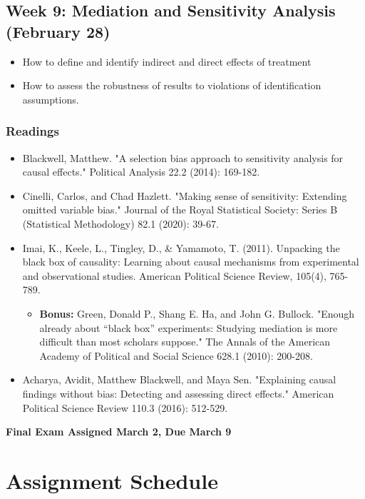 \documentclass[11pt, article, oneside]{memoir}
\theoremstyle{Assumption}
\begin{document}
\subsection{Week 9: Mediation and Sensitivity Analysis (February 28)}

\begin{itemize}
\item How to define and identify indirect and direct effects of treatment
\item How to assess the robustness of results to violations of identification assumptions. 
\end{itemize}

\subsubsection*{Readings}

\begin{itemize}
\item Blackwell, Matthew. "A selection bias approach to sensitivity analysis for causal effects." Political Analysis 22.2 (2014): 169-182.
\item Cinelli, Carlos, and Chad Hazlett. "Making sense of sensitivity: Extending omitted variable bias." Journal of the Royal Statistical Society: Series B (Statistical Methodology) 82.1 (2020): 39-67.
\item Imai, K., Keele, L., Tingley, D., \& Yamamoto, T. (2011). Unpacking the black box of causality: Learning about causal mechanisms from experimental and observational studies. American Political Science Review, 105(4), 765-789.
\begin{itemize}
\item \textbf{Bonus:} Green, Donald P., Shang E. Ha, and John G. Bullock. "Enough already about “black box” experiments: Studying mediation is more difficult than most scholars suppose." The Annals of the American Academy of Political and Social Science 628.1 (2010): 200-208.
\end{itemize}
\item Acharya, Avidit, Matthew Blackwell, and Maya Sen. "Explaining causal findings without bias: Detecting and assessing direct effects." American Political Science Review 110.3 (2016): 512-529.
\end{itemize}


\textbf{Final Exam Assigned March 2, Due March 9}

\section*{Assignment Schedule}
\end{document}
